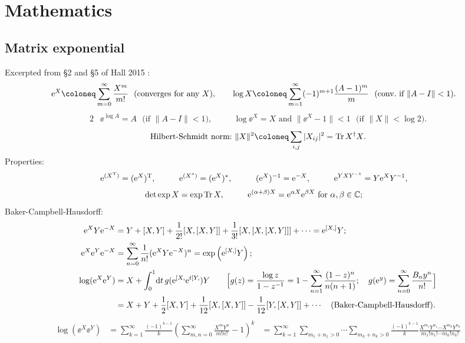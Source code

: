 \documentclass[CheatSheet]{subfiles}
\begin{document}
\detailstyle
\section{Mathematics}
\subsection{Matrix exponential}
Excerpted from \S2 and \S5 of Hall 2015 \cite{Hall2015}:
\begin{alignat}{2}
 &\ee^X \deq \sum_{m=0}^\infty \frac{X^m}{m!} \text{~~(converges for any $X$)},
\quad&
 &\log X \deq \sum_{m=1}^\infty (-1)^{m+1}\frac{(A-1)^m}{m} \text{~~(conv.~if $\|A-I\|<1$)}.
\end{alignat}
\begin{alignat}{2}
 &\ee^{\log A} = A \text{~~(if $\|A-I\|<1$)},
\quad&
 &\log \ee^X = X \text{~and~} \|\ee^X-1\| < 1 \text{~~(if $\|X\|<\log2$).}
\end{alignat}
\begin{equation}
 \text{Hilbert-Schmidt norm:}~\|X\|^2 \deq \sum_{i,j}|X_{ij}|^2 = {\Tr X^\dagger X}.
\end{equation}
Properties:
\begin{alignat*}{4}
 {\mathrm{e}}^{(X^{\mathrm{T}})} &= ({\mathrm{e}}^X)^{\mathrm{T}},
&\qquad
 {\mathrm{e}}^{(X^*)} &= ({\mathrm{e}}^X)^*,
&\qquad
 ({\mathrm{e}}^X)^{-1} &= {\mathrm{e}}^{-X},
&\qquad
 {\mathrm{e}}^{YXY^{-1}} &= Y{\mathrm{e}}^X Y^{-1},
\end{alignat*}
\begin{alignat*}{2}
 \det \exp X &= \exp\operatorname{\mathrm{Tr}} X,
&\qquad
 {\mathrm{e}}^{(\alpha+\beta)X} &= {\mathrm{e}}^{\alpha X}{\mathrm{e}}^{\beta X} \text{~for $\alpha, \beta\in \mathbb C$};
\end{alignat*}
Baker-Campbell-Hausdorff:
\begin{align}
  {\mathrm{e}}^X Y {\mathrm{e}}^{-X}
&= Y + [X, Y] + \frac1{2!}[X, [X, Y]] + \frac1{3!}[X, [X, [X, Y]]] + \cdots = {\mathrm{e}}^{[X,]}Y;
\\
  {\mathrm{e}}^X {\mathrm{e}}^Y {\mathrm{e}}^{-X}
&= \sum_{n=0}^\infty\frac{1}{n!}({\mathrm{e}}^X Y {\mathrm{e}}^{-X})^n
 = \exp\left({\mathrm{e}}^{[X,]}Y\right);
\\
  \log({\mathrm{e}}^X {\mathrm{e}}^Y)
&= X + \int_0^1\!{\mathrm{d}} t\, g({\mathrm{e}}^{[X,}{\mathrm{e}}^{t[Y,})Y
\qquad\Bigl[
  g(z) = \frac{\log z}{1-z^{-1}} = 1-\sum_{n=1}^{\infty}\frac{(1-z)^n}{n(n+1)};
\quad
g({\mathrm{e}}^y)=\sum_{n=0}^{\infty}\frac{B_ny^n}{n!}
\Bigr]\\
&= X + Y + \frac12[X,Y] + \frac1{12}[X, [X,Y]] - \frac1{12}[Y, [X,Y]] + \cdots
\quad\text{(Baker-Campbell-Hausdorff).}
\end{align}
\begin{align}
   \log(\ee^X\ee^Y)
&=\sum_{k=1}^\infty \frac{(-1)^{k-1}}{k}\left(\sum_{m,n=0}^{\infty}\frac{X^mY^n}{m!n!}-1\right)^k
&=\sum_{k=1}^\infty
   \sum_{m_1+n_1>0}\cdots\sum_{m_k+n_k>0}\frac{(-1)^{k-1}}{k}
\frac{X^{m_1}Y^{n_1}\cdots X^{m_k}Y^{n_k}}{m_1!n_1!\cdots m_k!n_k!}
\end{align}
\end{document}
